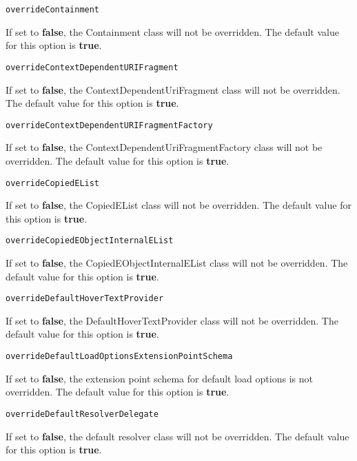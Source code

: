 \noindent\texttt{overrideContainment}
\begin{myindentpar}{1cm}
If set to \textbf{false}, the Containment class will not be overridden. The default value for this option is \textbf{true}.
\end{myindentpar}

\noindent\texttt{overrideContextDependentURIFragment}
\begin{myindentpar}{1cm}
If set to \textbf{false}, the ContextDependentUriFragment class will not be overridden. The default value for this option is \textbf{true}.
\end{myindentpar}

\noindent\texttt{overrideContextDependentURIFragmentFactory}
\begin{myindentpar}{1cm}
If set to \textbf{false}, the ContextDependentUriFragmentFactory class will not be overridden. The default value for this option is \textbf{true}.
\end{myindentpar}

\noindent\texttt{overrideCopiedEList}
\begin{myindentpar}{1cm}
If set to \textbf{false}, the CopiedEList class will not be overridden. The default value for this option is \textbf{true}.
\end{myindentpar}

\noindent\texttt{overrideCopiedEObjectInternalEList}
\begin{myindentpar}{1cm}
If set to \textbf{false}, the CopiedEObjectInternalEList class will not be overridden. The default value for this option is \textbf{true}.
\end{myindentpar}

\noindent\texttt{overrideDefaultHoverTextProvider}
\begin{myindentpar}{1cm}
If set to \textbf{false}, the DefaultHoverTextProvider class will not be overridden. The default value for this option is \textbf{true}.
\end{myindentpar}

\noindent\texttt{overrideDefaultLoadOptionsExtensionPointSchema}
\begin{myindentpar}{1cm}
If set to \textbf{false}, the extension point schema for default load options is not overridden. The default value for this option is \textbf{true}.
\end{myindentpar}

\noindent\texttt{overrideDefaultResolverDelegate}
\begin{myindentpar}{1cm}
If set to \textbf{false}, the default resolver class will not be overridden. The default value for this option is \textbf{true}.
\end{myindentpar}

